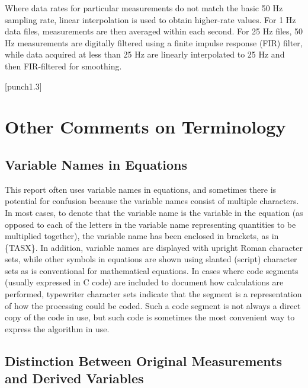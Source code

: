 \documentclass[
  english,
]{book}
\begin{document}
Where data rates for particular measurements do not match the basic 50 Hz sampling rate, linear interpolation is used to obtain higher-rate values. For 1 Hz data files, measurements are then averaged within each second. For 25 Hz files, 50 Hz measurements are digitally filtered using a finite impulse response (FIR) filter, while data acquired at less than 25 Hz are linearly interpolated to 25 Hz and then FIR-filtered for smoothing.

\protect\hypertarget{punch1.3}{}{{[}punch1.3{]}}

\hypertarget{other-comments-on-terminology}{%
\section{Other Comments on Terminology}\label{other-comments-on-terminology}}

\hypertarget{variable-names-in-equations}{%
\subsection{Variable Names in Equations}\label{variable-names-in-equations}}

This report often uses variable names in equations, and sometimes there is potential for confusion because the variable names consist of multiple characters. In most cases, to denote that the variable name is the variable in the equation (as opposed to each of the letters in the variable name representing quantities to be multiplied together), the variable name has been enclosed in brackets, as in \{TASX\}. In addition, variable names are displayed with upright Roman character sets, while other symbols in equations are shown using slanted (script) character sets as is conventional for mathematical equations. In cases where code segments (usually expressed in C code) are included to document how calculations are performed, typewriter character sets indicate that the segment is a representation of how the processing could be coded. Such a code segment is not always a direct copy of the code in use, but such code is sometimes the most convenient way to express the algorithm in use.

\hypertarget{distinction-between-original-measurements-and-derived-variables}{%
\subsection{Distinction Between Original Measurements and Derived Variables}\label{distinction-between-original-measurements-and-derived-variables}}
\end{document}
